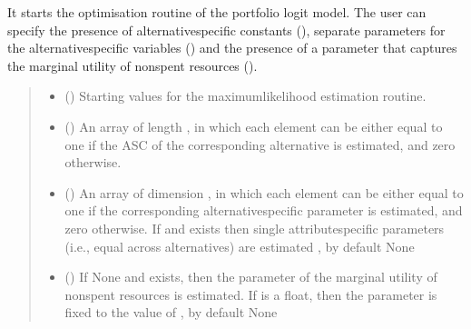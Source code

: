 \documentclass[a4paper,10pt,english]{sphinxhowto}
\begin{document}
\begin{fulllineitems}
\begin{fulllineitems}
\sphinxAtStartPar
It starts the optimisation routine of the portfolio logit model.
The user can specify the presence of alternative\sphinxhyphen{}specific constants
(), separate parameters for the alternative\sphinxhyphen{}specific variables
() and the presence of a parameter that captures the marginal
utility of non\sphinxhyphen{}spent resources ().
\begin{quote}\begin{description}
\begin{itemize}
\item {} 
\sphinxAtStartPar
{} () \textendash{} Starting values for the maximum\sphinxhyphen{}likelihood estimation routine.

\item {} 
\sphinxAtStartPar
{} () \textendash{} An array of length , in which each element can
be either equal to one if the ASC of the corresponding alternative
is estimated, and zero otherwise.

\item {} 
\sphinxAtStartPar
{} (\sphinxstyleliteralemphasis{\sphinxupquote{, }}) \textendash{} An array of dimension , in which each
element can be either equal to one if the corresponding
alternative\sphinxhyphen{}specific parameter is estimated, and zero otherwise.
If  and  exists then single attribute\sphinxhyphen{}specific
parameters (i.e., equal across alternatives) are estimated
, by default None

\item {} 
\sphinxAtStartPar
{} (\sphinxstyleliteralemphasis{\sphinxupquote{, }}) \textendash{} If None and  exists, then the parameter of the marginal utility
of non\sphinxhyphen{}spent resources is estimated. If  is a float, then
the parameter is fixed to the value of , by default None


\end{itemize}
\end{description}
\end{quote}
\end{fulllineitems}
\end{fulllineitems}
\end{document}
